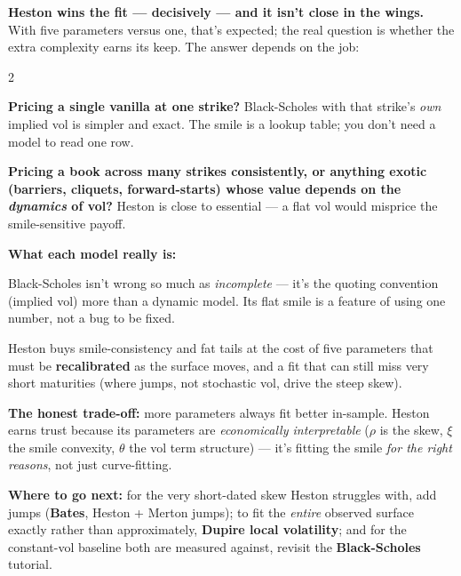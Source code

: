 \documentclass{pyportfolios-note}
\begin{document}
\textbf{Heston wins the fit — decisively — and it isn't close in the wings.}
With five parameters versus one, that's expected; the real question is whether
the extra complexity earns its keep. The answer depends on the job:

\begin{multicols}{2}
\begin{notebullets}
\item \textbf{Pricing a single vanilla at one strike?} Black-Scholes with that
      strike's \textit{own} implied vol is simpler and exact. The smile is a
      lookup table; you don't need a model to read one row.
\item \textbf{Pricing a book across many strikes consistently, or anything
      exotic (barriers, cliquets, forward-starts) whose value depends on the
      \textit{dynamics} of vol?} Heston is close to essential — a flat vol
      would misprice the smile-sensitive payoff.
\end{notebullets}

\textbf{What each model really is:}

\begin{notebullets}
\item Black-Scholes isn't wrong so much as \textit{incomplete} — it's the
      quoting convention (implied vol) more than a dynamic model. Its flat smile
      is a feature of using one number, not a bug to be fixed.
\item Heston buys smile-consistency and fat tails at the cost of five parameters
      that must be \textbf{recalibrated} as the surface moves, and a fit that
      can still miss very short maturities (where jumps, not stochastic vol,
      drive the steep skew).
\end{notebullets}
\end{multicols}

\textbf{The honest trade-off:} more parameters always fit better in-sample.
Heston earns trust because its parameters are \textit{economically
interpretable} ($\rho$ is the skew, $\xi$ the smile convexity, $\theta$ the vol
term structure) — it's fitting the smile \textit{for the right reasons}, not
just curve-fitting.

\textbf{Where to go next:} for the very short-dated skew Heston struggles with,
add jumps (\textbf{Bates}, Heston + Merton jumps); to fit the \textit{entire}
observed surface exactly rather than approximately, \textbf{Dupire local
volatility}; and for the constant-vol baseline both are measured against,
revisit the \textbf{Black-Scholes} tutorial.
\end{document}
